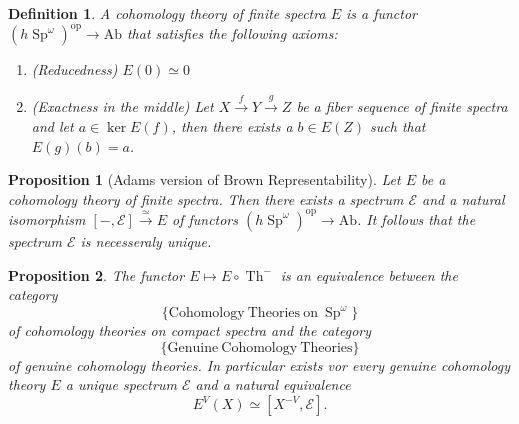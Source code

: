 \documentclass{article}
\newcommand{\xto}{\xrightarrow}
\newcommand{\op}{\mathrm{op}}
\DeclareMathOperator{\Sp}{Sp}
\DeclareMathOperator{\Th}{Th}
\newtheorem{proposition}{Proposition}
\newtheorem{definition}{Definition}
\begin{document}
  \begin{definition}
    A \emph{cohomology theory of finite spectra} $E$ is a functor 
    $ (h \Sp^\omega)^\op \to \mathrm{Ab}$ that satisfies the following axioms:
    \begin{enumerate}
      \item[(i)](Reducedness) $E(0) \simeq 0$
      \item[(ii)](Exactness in the middle) Let $X \xto{f} Y \xto{g} Z$ be 
      a fiber sequence of finite spectra and let $a \in \ker E(f)$, 
      then there exists a $b \in E(Z)$ such that $E(g)(b) = a$.
    \end{enumerate}
  \end{definition}
  
  \begin{proposition}[Adams version of Brown Representability]
    Let $E$ be a cohomology theory of finite spectra. Then there exists a spectrum 
    $\mathcal E$ and a natural isomorphism $[-, \mathcal E] \xto{\simeq} E$ of functors 
    $(h \Sp^\omega)^\op \to \mathrm{Ab}$.
    It follows that the spectrum $\mathcal E$ is necesseraly unique.
  \end{proposition}

  \begin{proposition}
    The functor $E \mapsto E \circ \Th^-$ is an equivalence between the category
    \[\{\mathrm{Cohomology\ Theories\ on\ }\Sp^\omega\}\] 
    of cohomology theories on compact spectra and 
    the category \[
        \{\mathrm{Genuine\ Cohomology\ Theories}\}
       \] of genuine cohomology theories.
    In particular exists vor every genuine cohomology theory $E$ a unique spectrum $\mathcal E$ and a natural 
    equivalence 
    \[
      E^V(X) \simeq [X^{-V}, \mathcal E]  .
    \]
  \end{proposition}
\end{document}
